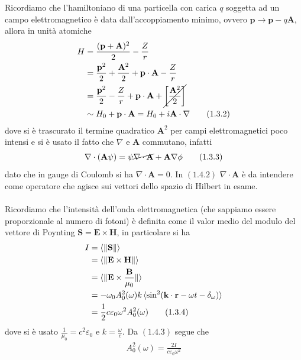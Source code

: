 \documentclass{article}
\begin{document}
Ricordiamo che l'hamiltoniano di una particella con carica $q$ soggetta ad un campo elettromagnetico è data dall'accoppiamento minimo, ovvero $\mathbf{p} \rightarrow \mathbf{p} - q\mathbf{A}$, allora in unità atomiche
\begin{align}
    H &= \frac{(\mathbf{p} + \mathbf{A})^2}{2} - \frac{Z}{r} \notag \\
    &= \frac{\mathbf{p}^2}{2} + \frac{\mathbf{A}^2}{2} + \mathbf{p} \cdot \mathbf{A} - \frac{Z}{r} \notag \\
    &= \frac{\mathbf{p}^2}{2} - \frac{Z}{r} + \mathbf{p} \cdot \mathbf{A} + \cancel{\left[\frac{\mathbf{A}^2}{2}\right]} \notag \\
    &\sim H_0 + \mathbf{p} \cdot \mathbf{A} = H_0 + i\mathbf{A} \cdot \nabla \tag{1.3.2}
\end{align} 
dove si è trascurato il termine quadratico $\mathbf{A}^2$ per campi elettromagnetici poco intensi e si è usato il fatto che $\nabla$ e $\mathbf{A}$ commutano, infatti 
\begin{align}
    \nabla \cdot (\mathbf{A}\psi) = \psi\cancel{\nabla \cdot \mathbf{A}} + \mathbf{A}\nabla\phi \tag{1.3.3}
\end{align}
dato che in gauge di Coulomb si ha $\nabla \cdot \mathbf{A} = 0$. In $(1.4.2)$ $\nabla \cdot \mathbf{A}$ è da intendere come operatore che agisce sui vettori dello spazio di Hilbert in esame. \\ \\
Ricordiamo che l'intensità dell'onda elettromagnetica (che sappiamo essere proporzionale al numero di fotoni) è definita come il valor medio del modulo del vettore di Poynting $\mathbf{S} = \mathbf{E} \times \mathbf{H}$, in particolare si ha 
\begin{align}
    I &= \braket{\|\mathbf{S}\|} \notag \\
    &= \braket{\|\mathbf{E} \times \mathbf{H}\|} \notag \\
    &= \braket{\|\mathbf{E} \times \frac{\mathbf{B}}{\mu_0}\|} \notag \\
    &= -\omega_0A^2_0(\omega)k\braket{\sin^2(\mathbf{k} \cdot \mathbf{r} - \omega t - \delta_\omega)} \notag \\
    &= \frac{1}{2}c\varepsilon_0\omega^2A^2_0(\omega) \tag{1.3.4}
\end{align}
dove si è usato $\frac{1}{\mu_0} = c^2\varepsilon_0$ e $k = \frac{\omega}{c}$. Da $(1.4.3)$ segue che 
\begin{align}
    A^2_0(\omega) = \frac{2I}{c\varepsilon_0\omega^2} \tag{1.3.5}
\end{align}
\end{document}
